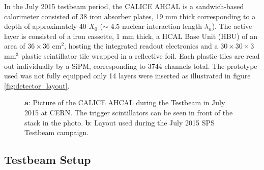 \documentclass[twoside,a4paper,11pt]{article}
\begin{document}
In the July 2015 testbeam period, the CALICE AHCAL is a sandwich-based calorimeter consisted of 38 iron absorber plates, 19 mm thick corresponding to a depth of approximately 40 $X_0$ ($\sim$ 4.5 nuclear interaction length $\lambda_{n}$). The active layer is consisted of a iron cassette, 1 mm thick, a HCAL Base Unit (HBU) of an area of $36\times36$ cm$^2$, hosting the integrated readout electronics and a $30\times30\times3$ mm$^3$ plastic scintillator tile wrapped in a reflective foil. Each plastic tiles are read out individually by a SiPM, corresponding to 3744 channels total.
The prototype used was not fully equipped only 14 layers were inserted as illustrated in figure \ref{fig:detector_layout}. 

\begin{figure}[htbp]
	\hfill
	\caption[]{\textbf{a}: Picture of the CALICE AHCAL during the Testbeam in July 2015 at CERN. The trigger scintillators can be seen in front of the stack in the photo. \textbf{b}: Layout used during the July 2015 SPS Testbeam campaign.}
	\label{fig:full_detector_layout}
\end{figure}
\subsection{Testbeam Setup}
\end{document}
